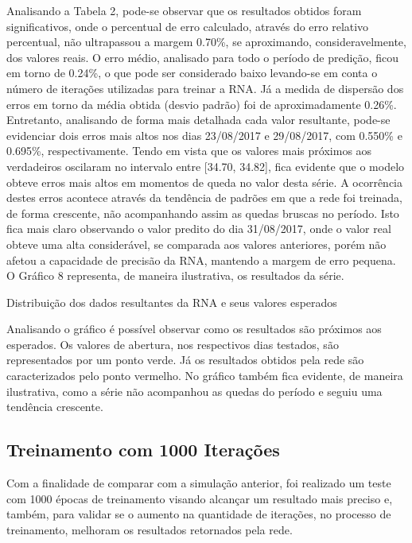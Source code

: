 Analisando a Tabela 2, pode-se observar que os resultados obtidos foram significativos, onde o percentual de erro calculado, através do erro relativo percentual, não ultrapassou a margem 0.70\%, se aproximando, consideravelmente, dos valores reais. O erro médio, analisado para todo o período de predição, ficou em torno de 0.24\%, o que pode ser considerado baixo levando-se em conta o número de iterações utilizadas para treinar a RNA. Já a medida de dispersão dos erros em torno da média obtida (desvio padrão) foi de aproximadamente 0.26\%. Entretanto, analisando de forma mais detalhada cada valor resultante, pode-se evidenciar dois erros mais altos nos dias 23/08/2017 e 29/08/2017, com 0.550\% e 0.695\%, respectivamente. Tendo em vista que os valores mais próximos aos verdadeiros oscilaram no intervalo entre [34.70, 34.82], fica evidente que o modelo obteve erros mais altos em momentos de queda no valor desta série. A ocorrência destes erros acontece através da tendência de padrões em que a rede foi treinada, de forma crescente, não acompanhando assim as quedas bruscas no período. Isto fica mais claro observando o valor predito do dia 31/08/2017, onde o valor real obteve uma alta considerável, se comparada aos valores anteriores, porém não afetou a capacidade de precisão da RNA, mantendo a margem de erro pequena. O Gráfico 8 representa, de maneira ilustrativa, os resultados da série.
\begin{grafico}[h]
	\centering
	\caption{Distribuição dos dados resultantes da RNA e seus valores esperados}
	\label{lingua}
\end{grafico}

Analisando o gráfico é possível observar como os resultados são próximos aos esperados. Os valores de abertura, nos respectivos dias testados, são representados por um ponto verde. Já os resultados obtidos pela rede são caracterizados pelo ponto vermelho. No gráfico também fica evidente, de maneira ilustrativa, como a série não acompanhou as quedas do período e seguiu uma tendência crescente. 

\subsection{Treinamento com 1000 Iterações}	
Com a finalidade de comparar com a simulação anterior, foi realizado um teste com 1000 épocas de treinamento visando alcançar um resultado mais preciso e, também, para validar se o aumento na quantidade de iterações, no processo de treinamento, melhoram os resultados retornados pela rede.

